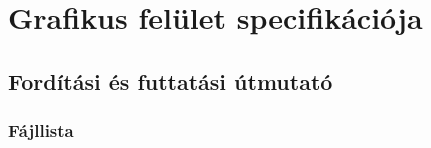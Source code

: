 %
\chapter{Grafikus felület specifikációja}

\thispagestyle{fancy}

\section{Fordítási és futtatási útmutató}

\subsection{Fájllista}

